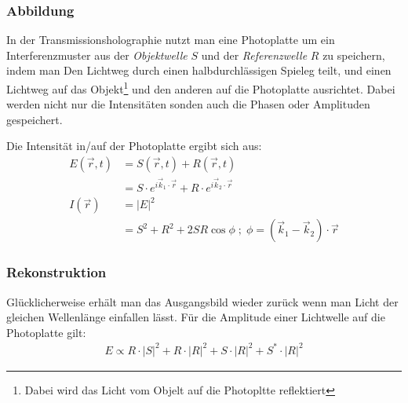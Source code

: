 \subsubsection{Abbildung}
In der Transmissionsholographie nutzt man eine Photoplatte um ein Interferenzmuster aus der \textit{Objektwelle} $S$ und der \textit{Referenzwelle} $R$ zu speichern, indem man Den Lichtweg durch einen halbdurchlässigen Spieleg teilt, und einen Lichtweg auf das Objekt\footnote{Dabei wird das Licht vom Objelt auf die Photopltte reflektiert} und den anderen auf die Photoplatte ausrichtet. Dabei werden nicht nur die Intensitäten sonden auch die Phasen oder Amplituden gespeichert.


Die Intensität in/auf der Photoplatte ergibt sich aus:
\begin{align}
E(\vec{r}, t) &= S(\vec{r}, t) + R(\vec{r}, t) \\
              &= S \cdot e^{i\vec{k}_1\cdot\vec{r}} + R \cdot e^{i\vec{k}_2\cdot\vec{r}} \\
I(\vec{r})    &= \left| E \right|^2 \\
              &= S^2 + R^2 + 2SR\cos \phi \; ; \; \phi = \left(\vec{k}_1 - \vec{k}_2 \right) \cdot \vec{r}
\end{align}
\subsubsection{Rekonstruktion}
Glücklicherweise erhält man das Ausgangsbild wieder zurück wenn man Licht der gleichen Wellenlänge einfallen lässt. Für die Amplitude einer Lichtwelle auf die Photoplatte gilt:
\begin{align}
E \propto R \cdot \left|S\right|^2 + R \cdot \left|R\right|^2 + S \cdot \left|R\right|^2 + S^* \cdot \left|R\right|^2
\end{align}
\newpage
